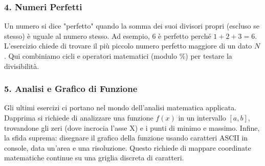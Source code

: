\subsubsection{4. Numeri Perfetti}
Un numero si dice "perfetto" quando la somma dei suoi divisori propri (escluso se stesso) è uguale al numero stesso. Ad esempio, 6 è perfetto perché $1+2+3 = 6$.
L'esercizio chiede di trovare il più piccolo numero perfetto maggiore di un dato $N$. Qui combiniamo cicli e operatori matematici (modulo \%) per testare la divisibilità.

\subsubsection{5. Analisi e Grafico di Funzione}
Gli ultimi esercizi ci portano nel mondo dell'analisi matematica applicata.
Dapprima si richiede di analizzare una funzione $f(x)$ in un intervallo $[a, b]$, trovandone gli zeri (dove incrocia l'asse X) e i punti di minimo e massimo.
Infine, la sfida suprema: disegnare il grafico della funzione usando caratteri ASCII in console, data un'area e una risoluzione. Questo richiede di mappare coordinate matematiche continue su una griglia discreta di caratteri.
